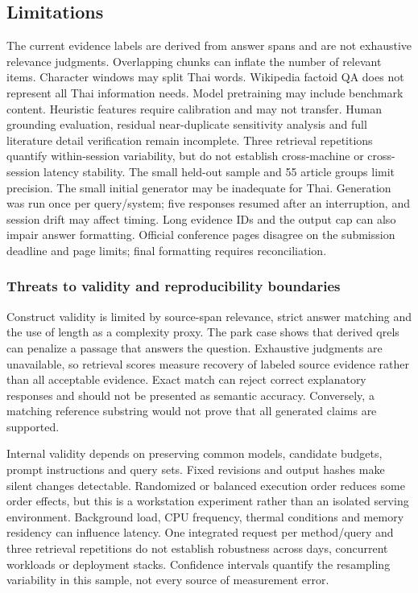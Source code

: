 \documentclass[10pt,a4paper]{article}
\begin{document}
\hypertarget{limitations}{%
\subsection{Limitations}\label{limitations}}

The current evidence labels are derived from answer spans and are not
exhaustive relevance judgments. Overlapping chunks can inflate the
number of relevant items. Character windows may split Thai words.
Wikipedia factoid QA does not represent all Thai information needs.
Model pretraining may include benchmark content. Heuristic features
require calibration and may not transfer. Human grounding evaluation,
residual near-duplicate sensitivity analysis and full literature detail
verification remain incomplete. Three retrieval repetitions quantify
within-session variability, but do not establish cross-machine or
cross-session latency stability. The small held-out sample and 55
article groups limit precision. The small initial generator may be
inadequate for Thai. Generation was run once per query/system; five
responses resumed after an interruption, and session drift may affect
timing. Long evidence IDs and the output cap can also impair answer
formatting. Official conference pages disagree on the submission
deadline and page limits; final formatting requires reconciliation.

\hypertarget{threats-to-validity-and-reproducibility-boundaries}{%
\subsubsection{Threats to validity and reproducibility
boundaries}\label{threats-to-validity-and-reproducibility-boundaries}}

Construct validity is limited by source-span relevance, strict answer
matching and the use of length as a complexity proxy. The park case
shows that derived qrels can penalize a passage that answers the
question. Exhaustive judgments are unavailable, so retrieval scores
measure recovery of labeled source evidence rather than all acceptable
evidence. Exact match can reject correct explanatory responses and
should not be presented as semantic accuracy. Conversely, a matching
reference substring would not prove that all generated claims are
supported.

Internal validity depends on preserving common models, candidate
budgets, prompt instructions and query sets. Fixed revisions and output
hashes make silent changes detectable. Randomized or balanced execution
order reduces some order effects, but this is a workstation experiment
rather than an isolated serving environment. Background load, CPU
frequency, thermal conditions and memory residency can influence
latency. One integrated request per method/query and three retrieval
repetitions do not establish robustness across days, concurrent
workloads or deployment stacks. Confidence intervals quantify the
resampling variability in this sample, not every source of measurement
error.
\end{document}
